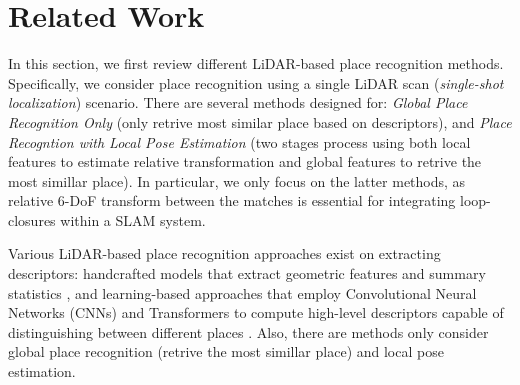 \chapter{Related Work}
\label{sec:related}



In this section, we first review different LiDAR-based place recognition methods. Specifically, we consider place recognition using a single LiDAR scan (\emph{single-shot localization}) scenario.
There are several methods designed for: \emph{Global Place Recognition Only} (only retrive most similar place based on descriptors), and \emph{Place Recogntion with Local Pose Estimation} (two stages process using both local features to estimate relative transformation and global features to retrive the most simillar place). In particular, we only focus on the latter methods, as relative 6-DoF transform between the matches is essential for integrating loop-closures within a SLAM system.  


Various LiDAR-based place recognition approaches exist on extracting descriptors: handcrafted models that extract geometric features and summary statistics \cite{kim2018iros, yuan2023icra}, and learning-based approaches that employ Convolutional Neural Networks (CNNs) and Transformers to compute high-level descriptors capable of distinguishing between different places \cite{uy2018cvpr,vidanapathirana2022icra, komorowski2022ral}. Also, there are methods only consider global place recognition (retrive the most simillar place) and local pose estimation.
 

